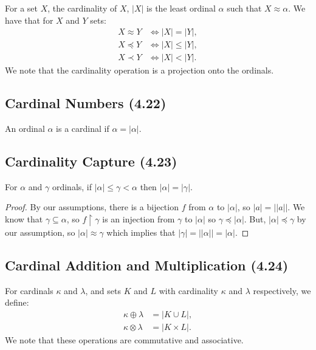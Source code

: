 For a set $X$, the cardinality of $X$, $|X|$ is the
least ordinal $\alpha$ such that $X \approx \alpha$.
We have that for $X$ and $Y$ sets: \begin{align*}
    X \approx Y &\Longleftrightarrow |X| = |Y|, \\
    X \preceq Y &\Longleftrightarrow |X| \leq |Y|, \\
    X \prec Y &\Longleftrightarrow |X| < |Y|.
\end{align*} We note that the cardinality operation is a projection onto the ordinals.

\subsection{Cardinal Numbers (4.22)} \label{4.22}

An ordinal $\alpha$ is a cardinal if $\alpha = |\alpha|$.

\subsection{Cardinality Capture (4.23)} \label{4.23}

For $\alpha$ and $\gamma$ ordinals, if
$|\alpha| \leq \gamma < \alpha$ then $|\alpha| = |\gamma|$.

\begin{proof}
    By our assumptions, there is a bijection $f$ from $\alpha$
    to $|\alpha|$, so $|a| = ||a||$. We know that $\gamma
    \subseteq \alpha$, so $f \upharpoonright \gamma$ is an injection 
    from $\gamma$ to $|\alpha|$ so $\gamma \preceq |\alpha|$. But, 
    $|\alpha| \preceq \gamma$ by our assumption,
    so $|\alpha| \approx \gamma$ which implies that
    $|\gamma| = ||\alpha|| = |\alpha|$.
\end{proof}

\subsection{Cardinal Addition and Multiplication (4.24)} \label{4.24}

For cardinals $\kappa$ and $\lambda$, and sets $K$ and $L$ with cardinality
$\kappa$ and $\lambda$ respectively, we define: \begin{align*}
    \kappa \oplus \lambda &= |K \cup L|, \tag{for $K$ and $L$ disjoint} \\
    \kappa \otimes \lambda &= |K \times L|.
\end{align*} We note that these operations are commutative and associative.

